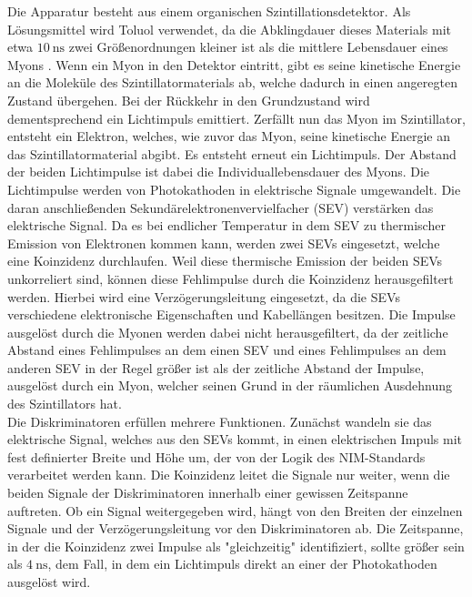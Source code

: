 Die Apparatur besteht aus einem organischen Szintillationsdetektor.
Als Lösungsmittel wird Toluol verwendet, da die Abklingdauer dieses Materials mit etwa $\SI{10}{\nano\second}$ zwei Größenordnungen kleiner ist als die mittlere Lebensdauer eines Myons \cite{Agashe:2014kda}.
Wenn ein Myon in den Detektor eintritt, gibt es seine kinetische Energie an die Moleküle des Szintillatormaterials ab, welche dadurch in einen angeregten Zustand übergehen.
Bei der Rückkehr in den Grundzustand wird dementsprechend ein Lichtimpuls emittiert.
Zerfällt nun das Myon im Szintillator, entsteht ein Elektron, welches, wie zuvor das Myon, seine kinetische Energie an das Szintillatormaterial abgibt.
Es entsteht erneut ein Lichtimpuls.
Der Abstand der beiden Lichtimpulse ist dabei die Individuallebensdauer des Myons.
Die Lichtimpulse werden von Photokathoden in elektrische Signale umgewandelt.
Die daran anschließenden Sekundärelektronenvervielfacher (SEV) verstärken das elektrische Signal.
Da es bei endlicher Temperatur in dem SEV zu thermischer Emission von Elektronen kommen kann, werden zwei SEVs eingesetzt, welche eine Koinzidenz durchlaufen.
Weil diese thermische Emission der beiden SEVs unkorreliert sind, können diese Fehlimpulse durch die Koinzidenz herausgefiltert werden.
Hierbei wird eine Verzögerungsleitung eingesetzt, da die SEVs verschiedene elektronische Eigenschaften und Kabellängen besitzen.
Die Impulse ausgelöst durch die Myonen werden dabei nicht herausgefiltert, da der zeitliche Abstand eines Fehlimpulses an dem einen SEV und eines Fehlimpulses an dem anderen SEV in der Regel größer ist als der zeitliche Abstand der Impulse, ausgelöst durch ein Myon, welcher seinen Grund in der räumlichen Ausdehnung des Szintillators hat.\\
Die Diskriminatoren erfüllen mehrere Funktionen.
Zunächst wandeln sie das elektrische Signal, welches aus den SEVs kommt, in einen elektrischen Impuls mit fest definierter Breite und Höhe um, der von der Logik des NIM-Standards verarbeitet werden kann.
Die Koinzidenz leitet die Signale nur weiter, wenn die beiden Signale der Diskriminatoren innerhalb einer gewissen Zeitspanne auftreten.
Ob ein Signal weitergegeben wird, hängt von den Breiten der einzelnen Signale und der Verzögerungsleitung vor den Diskriminatoren ab.
Die Zeitspanne, in der die Koinzidenz zwei Impulse als "gleichzeitig" identifiziert, sollte größer sein als $\SI{4}{\nano\second}$, dem Fall, in dem ein Lichtimpuls direkt an einer der Photokathoden ausgelöst wird.
